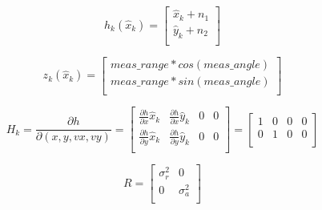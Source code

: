 \documentclass[12pt]{article}
\begin{document}
\[
h_{k}(\hat{x}_{k})=
  \begin{bmatrix}
     \hat{x}_k + n_{1}  \\
    \hat{y}_k + n_{2}\\

  \end{bmatrix}
\]


\[
z_{k}(\hat{x}_{k})=
  \begin{bmatrix}
     meas\_range * cos(meas\_angle)  \\
     meas\_range * sin(meas\_angle)\\

  \end{bmatrix}
\]


\[
H_{k} = \frac{\partial h}{\partial (x, y, vx, vy)} =
\begin{bmatrix}
\frac{\partial h}{\partial x} \hat{x}_k &   \frac{\partial h}{\partial x} \hat{y}_k & 0 & 0\\
\frac{\partial h}{\partial y} \hat{x}_k   &  \frac{\partial h}{\partial y} \hat{y}_k &  0 & 0\\

\end{bmatrix}
=
  \begin{bmatrix}
1 & 0 & 0 & 0\\
0 & 1 & 0 & 0\\
  \end{bmatrix}
\]




\[
R =
  \begin{bmatrix}
\sigma_r^{2}  & 0\\
0 & \sigma_a^{2} \\
  \end{bmatrix}
\]
\end{document}
